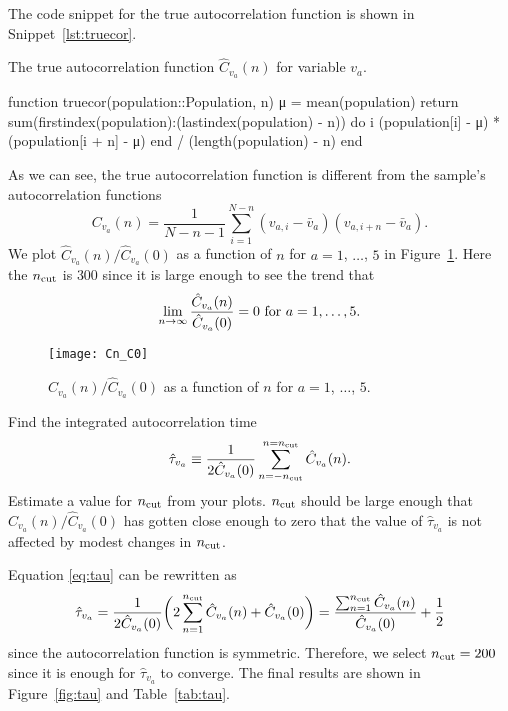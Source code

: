 \Answer{}
The code snippet for the true autocorrelation function is shown in Snippet~\ref{lst:truecor}.
%
\begin{algorithm}
    \caption{The true autocorrelation function \(\hat{C}_{v_a}(n)\) for variable \(v_a\).}
    \label{lst:truecor}
    \begin{juliacode}
        function truecor(population::Population, n)
            μ = mean(population)
            return sum(firstindex(population):(lastindex(population) - n)) do i
                (population[i] - μ) * (population[i + n] - μ)
            end / (length(population) - n)
        end
    \end{juliacode}
\end{algorithm}
%
As we can see, the true autocorrelation function is different from the sample's
autocorrelation functions
%
\begin{equation}
    C_{v_a}(n) = \frac{ 1 }{ N - n - 1 }
    \sum_{i=1}^{N-n} (v_{a,i} - \bar{v}_a) (v_{a,i + n} - \bar{v}_a).
\end{equation}
%
We plot \(\hat{C}_{v_a}(n) / \hat{C}_{v_a}(0)\) as a function of \(n\) for \(a = 1\), \(\ldots\),
\(5\) in Figure~\ref{fig:truecor}.
Here the \(n_\textnormal{cut}\) is \(300\) since it is large enough to see the trend
that
%
\begin{equation}
    \lim_{n \rightarrow \infty} \frac{ \hat{C}_{v_a}(n) }{ \hat{C}_{v_a}(0) } = 0
    \textnormal{  for } a = 1, \ldots, 5.
\end{equation}

\begin{figure}[h]
    \centering
    \texttt{[image: Cn\_C0]}
    \caption{\(\hat{C}_{v_a}(n) / \hat{C}_{v_a}(0)\) as a function of \(n\) for
        \(a = 1\), \(\ldots\), \(5\).}
    \label{fig:truecor}
\end{figure}

\Question{} Find the integrated autocorrelation time
%
\begin{equation}\label{eq:tau}
    \hat{\tau}_{v_a} \equiv \frac{ 1 }{ 2 \hat{C}_{v_a}(0) }
    \sum_{n=-n_\textnormal{cut}}^{n=n_\textnormal{cut}} \hat{C}_{v_a}(n).
\end{equation}
%
Estimate a value for \(n_\textnormal{cut}\) from your plots.
\(n_\textnormal{cut}\) should be large enough that \(\hat{C}_{v_a}(n) / \hat{C}_{v_a}(0)\)
has gotten close enough to zero that the value of \(\hat{\tau}_{v_a}\)
is not affected by modest changes in \(n_\textnormal{cut}\).

\Answer{}
Equation \eqref{eq:tau} can be rewritten as
%
\begin{equation}
    \hat{\tau}_{v_a} = \frac{ 1 }{ 2 \hat{C}_{v_a}(0) }
    \biggl( 2\sum_{n=1}^{n_\textnormal{cut}} \hat{C}_{v_a}(n) + \hat{C}_{v_a}(0) \biggr)
    = \frac{ \sum_{n=1}^{n_\textnormal{cut}} \hat{C}_{v_a}(n) }{ \hat{C}_{v_a}(0) }
    + \frac{ 1 }{ 2 }
\end{equation}
%
since the autocorrelation function is symmetric.
Therefore, we select \(n_\textnormal{cut} = 200\) since it is enough for \(\hat{\tau}_{v_a}\)
to converge.
The final results are shown in Figure~\ref{fig:tau} and Table~\ref{tab:tau}.


